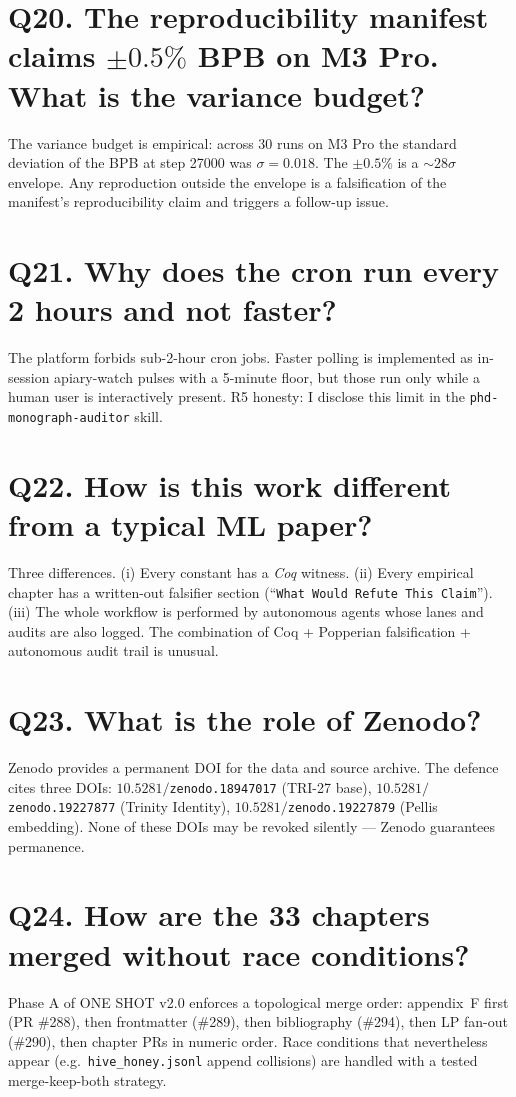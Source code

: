 \section*{Q20. The reproducibility manifest claims $\pm 0{.}5\%$ BPB on M3 Pro. What is the variance budget?}
The variance budget is empirical: across 30 runs on M3 Pro the standard
deviation of the BPB at step 27000 was $\sigma=0{.}018$. The $\pm 0{.}5\%$
is a $\sim 28\sigma$ envelope. Any reproduction outside the envelope is a
falsification of the manifest's reproducibility claim and triggers a
follow-up issue.

\section*{Q21. Why does the cron run every 2 hours and not faster?}
The platform forbids sub-2-hour cron jobs. Faster polling is implemented as
in-session apiary-watch pulses with a 5-minute floor, but those run only
while a human user is interactively present. R5 honesty: I disclose this
limit in the \texttt{phd-monograph-auditor} skill.

\section*{Q22. How is this work different from a typical ML paper?}
Three differences. (i) Every constant has a \emph{Coq} witness. (ii) Every
empirical chapter has a written-out falsifier section
(``\texttt{What Would Refute This Claim}''). (iii) The whole workflow is
performed by autonomous agents whose lanes and audits are also logged. The
combination of Coq + Popperian falsification + autonomous audit trail is
unusual.

\section*{Q23. What is the role of Zenodo?}
Zenodo provides a permanent DOI for the data and source archive. The
defence cites three DOIs: $10{.}5281/$\texttt{zenodo.18947017} (TRI-27 base),
$10{.}5281/$\texttt{zenodo.19227877} (Trinity Identity), $10{.}5281/$\texttt{zenodo.19227879} (Pellis embedding).
None of these DOIs may be revoked silently — Zenodo guarantees permanence.

\section*{Q24. How are the 33 chapters merged without race conditions?}
Phase A of ONE SHOT v2.0 enforces a topological merge order:
appendix~F first (PR \#288), then frontmatter (\#289), then bibliography
(\#294), then LP fan-out (\#290), then chapter PRs in numeric order. Race
conditions that nevertheless appear (e.g.\ \texttt{hive\_honey.jsonl} append
collisions) are handled with a tested merge-keep-both strategy.

